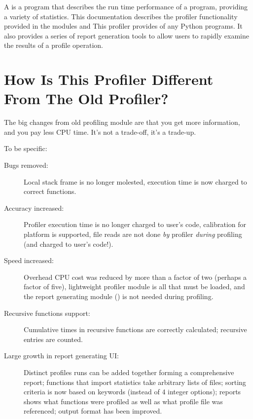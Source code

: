 A  is a program that describes the run time performance
of a program, providing a variety of statistics.  This documentation
describes the profiler functionality provided in the modules
 and   This profiler provides
 of any Python programs.  It also
provides a series of report generation tools to allow users to rapidly
examine the results of a profile operation.


\section{How Is This Profiler Different From The Old Profiler?}

The big changes from old profiling module are that you get more
information, and you pay less CPU time.  It's not a trade-off, it's a
trade-up.

To be specific:

\begin{description}

\item[Bugs removed:]
Local stack frame is no longer molested, execution time is now charged
to correct functions.

\item[Accuracy increased:]
Profiler execution time is no longer charged to user's code,
calibration for platform is supported, file reads are not done \emph{by}
profiler \emph{during} profiling (and charged to user's code!).

\item[Speed increased:]
Overhead CPU cost was reduced by more than a factor of two (perhaps a
factor of five), lightweight profiler module is all that must be
loaded, and the report generating module () is not needed
during profiling.

\item[Recursive functions support:]
Cumulative times in recursive functions are correctly calculated;
recursive entries are counted.

\item[Large growth in report generating UI:]
Distinct profiles runs can be added together forming a comprehensive
report; functions that import statistics take arbitrary lists of
files; sorting criteria is now based on keywords (instead of 4 integer
options); reports shows what functions were profiled as well as what
profile file was referenced; output format has been improved.

\end{description}


